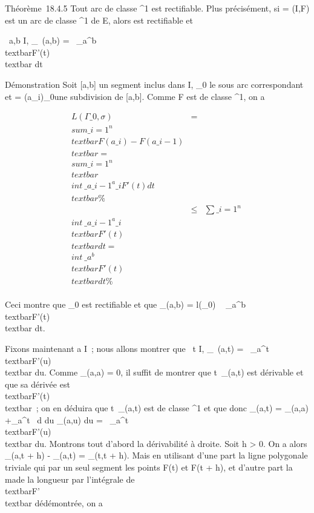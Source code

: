 \documentclass[]{article}
\begin{document}
Théorème~18.4.5 Tout arc de classe ^1 est rectifiable. Plus
précisément, si \Gamma = (I,F) est un arc de classe ^1 de E,
alors \Gamma est rectifiable et

\forall~a,b \in I, \ell\_\Gamma~(a,b)
=\int ~
\_a^b\\textbar{}F'(t)\\textbar{}
dt

Démonstration Soit {[}a,b{]} un segment inclus dans I, \Gamma\_0 le
sous arc correspondant et \sigma = (a\_i)\_0\leqi\leqn une
subdivision de {[}a,b{]}. Comme F est de classe ^1, on a

\begin{align*} L(\Gamma\_0,\sigma)& =&
\\sum
\_i=1^n\\textbar{}F(a\_ i) -
F(a\_i-1)\\textbar{} =
\\sum
\_i=1^n\\textbar{}
\\int  ~
\_a\_i-1^a\_i F'(t)
dt\\textbar{}\%& \\ & \leq&
\sum \_i=1^n~
\\int  ~
\_a\_i-1^a\_i
\\textbar{}F'(t)\\textbar{} dt =
\\int  ~
\_a^b\\textbar{}F'(t)\\textbar{}
dt \%& \\
\end{align*}

Ceci montre que \Gamma\_0 est rectifiable et que \ell\_\Gamma(a,b) =
l(\Gamma\_0) \leq\int ~
\_a^b\\textbar{}F'(t)\\textbar{}
dt.

Fixons maintenant a \in I~; nous allons montrer que
\forall~t \in I, \ell\_\Gamma~(a,t)
=\int ~
\_a^t\\textbar{}F'(u)\\textbar{}
du. Comme \ell\_\Gamma(a,a) = 0, il suffit de montrer que
t\mapsto~\ell\_\Gamma(a,t) est dérivable et que sa
dérivée est \\textbar{}F'(t)\\textbar{}~;
on en déduira que t\mapsto~\ell\_\Gamma(a,t) est de
classe ^1 et que donc \ell\_\Gamma(a,t) = \ell\_\Gamma(a,a)
+\int  \_a^t~ d
\over du \ell\_\Gamma(a,u) du
=\int ~
\_a^t\\textbar{}F'(u)\\textbar{}
du. Montrons tout d'abord la dérivabilité à droite. Soit h
\textgreater{} 0. On a alors \ell\_\Gamma(a,t + h) - \ell\_\Gamma(a,t) =
\ell\_\Gamma(t,t + h). Mais en utilisant d'une part la ligne polygonale
triviale qui \jmathoint par un seul segment les points F(t) et F(t + h), et
d'autre part la ma\jmathoration de la longueur par l'intégrale de
\\textbar{}F'\\textbar{} dé démontrée,
on a
\end{document}
